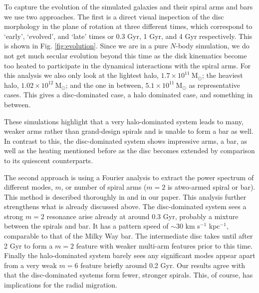 To capture the evolution of the simulated galaxies and their spiral arms and bars we use two approaches. The first is a direct visual inspection of the disc morphology in the plane of rotation at three different times, which correspond to `early', `evolved', and `late' times or 0.3 Gyr, 1 Gyr, and 4 Gyr respectively. This is shown in Fig. \ref{fig:evolution}. Since we are in a pure $N$-body simulation, we do not get much secular evolution beyond this time as the disk kinematics become too heated to participate in the dynamical interactions with the spiral arms. For this analysis we also only look at the lightest halo, $1.7\times 10^{11}\ \mathrm{M}_\odot$; the heaviest halo, $1.02\times 10^{12}\ \mathrm{M}_\odot$; and the one in between, $5.1\times 10^{11}\ \mathrm{M}_\odot$ as representative cases. This gives a disc-dominated case, a halo dominated case, and something in between. 

These simulations highlight that a very halo-dominated system leads to many, weaker arms rather than grand-design spirals and is unable to form a bar as well. In contrast to this, the disc-dominated system shows impressive arms, a bar, as well as the heating mentioned before as the disc becomes extended by comparison to its quiescent counterparts.

The second approach is using a Fourier analysis to extract the power spectrum of different modes, $m$, or number of spiral arms ($m=2$ is atwo-armed spiral or bar). This method is described thoroughly in \cite{roskar:12} and in our paper. This analysis further strengthens what is already discussed above. The disc-dominated system sees a strong $m=2$ resonance arise already at around 0.3 Gyr, probably a mixture between the spirals and bar. It has a pattern speed of ${\sim}30$ km s$^{-1}$ kpc$^{-1}$, comparable to that of the Milky Way bar. The intermediate disc takes until after 2 Gyr to form a $m=2$ feature with weaker multi-arm features prior to this time. Finally the halo-dominated system barely sees any significant modes appear apart from a very weak $m=6$ feature briefly around 0.2 Gyr. Our results agree with \cite{donghia:15} that the disc-dominated systems form fewer, stronger spirals. This, of course, has implications for the radial migration.

